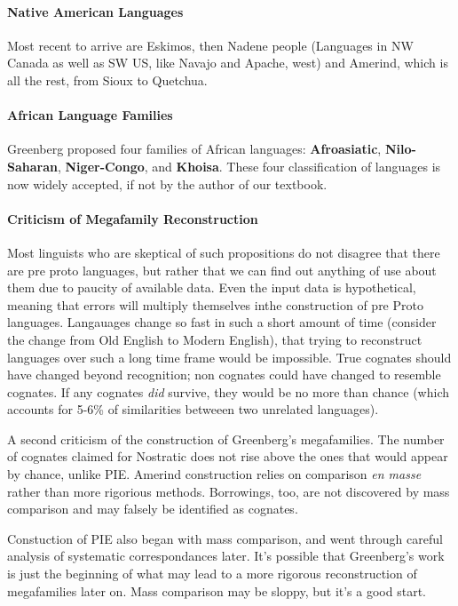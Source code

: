 \documentclass{exam}
\begin{document}
\paragraph{Native American Languages}Most recent to arrive are Eskimos, then Nadene people (Languages in NW Canada as well as SW US, like Navajo and Apache, west) and Amerind, which is all the rest, from Sioux to Quetchua. 


\paragraph{African Language Families} Greenberg proposed four families of African languages: \textbf{Afroasiatic}, \textbf{Nilo-Saharan}, \textbf{Niger-Congo}, and \textbf{Khoisa}. 
These four classification of languages is now widely accepted, if not by the author of our textbook. 


\paragraph{Criticism of Megafamily Reconstruction} Most linguists who are skeptical of such propositions do not disagree that there are pre proto languages, but rather that we can find out anything of use about them due to paucity of available data. 
Even the input data is hypothetical, meaning that errors will multiply themselves inthe construction of pre Proto languages. 
Langauages change so fast in such a short amount of time (consider the change from Old English to Modern English), that trying to reconstruct languages over such a long time frame would be impossible. 
True cognates should have changed beyond recognition; non cognates could have changed to resemble cognates. 
If any cognates \textit{did} survive, they would be no more than chance (which accounts for 5-6\% of similarities betweeen two unrelated languages). 

A second criticism of the construction of Greenberg's megafamilies. 
The number of cognates claimed for Nostratic does not rise above the ones that would appear by chance, unlike PIE. 
Amerind construction relies on comparison \textit{en masse} rather than more rigorious methods. 
Borrowings, too, are not discovered by mass comparison and may falsely be identified as cognates. 

Constuction of PIE also began with mass comparison, and went through careful analysis of systematic correspondances later. 
It's possible that Greenberg's work is just the beginning of what may lead to a more rigorous reconstruction of megafamilies later on. 
Mass comparison may be sloppy, but it's a good start. 
\end{document}
